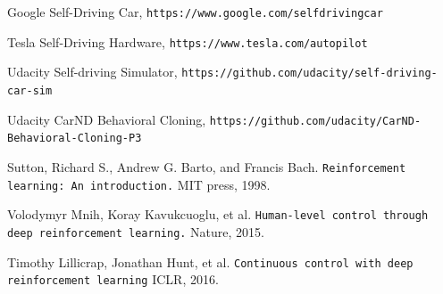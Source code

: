 \documentclass[a4paper]{article}
\begin{document}
\begin{thebibliography}{9}
  Google Self-Driving Car, \texttt{https://www.google.com/selfdrivingcar}

  Tesla Self-Driving Hardware, \texttt{https://www.tesla.com/autopilot}

  Udacity Self-driving Simulator, \texttt{https://github.com/udacity/self-driving-car-sim}

  Udacity CarND Behavioral Cloning, \texttt{https://github.com/udacity/CarND-Behavioral-Cloning-P3}

    Sutton, Richard S., Andrew G. Barto, and Francis Bach. \texttt{Reinforcement learning: An
    introduction.} MIT press, 1998.

  Volodymyr Mnih, Koray Kavukcuoglu, et al. \texttt{Human-level control through deep
  reinforcement learning.} Nature, 2015.
  
   Timothy Lillicrap, Jonathan Hunt, et al. \texttt{Continuous control with deep reinforcement learning} ICLR, 2016.

\end{thebibliography}
\end{document}
